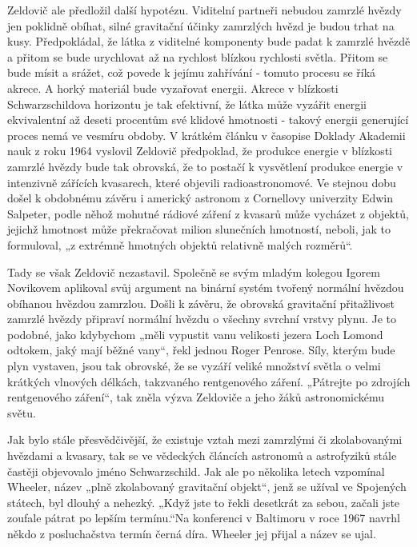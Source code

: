   Zeldovič ale předložil další hypotézu. Viditelní partneři nebudou zamrzlé hvězdy jen poklidně
  obíhat, silné gravitační účinky zamrzlých hvězd je budou trhat na kusy. Předpokládal, že látka z
  viditelné komponenty bude padat k zamrzlé hvězdě a přitom se bude urychlovat až na rychlost
  blízkou rychlosti světla. Přitom se bude mísit a srážet, což povede k jejímu zahřívání - tomuto
  procesu se říká akrece. A horký materiál bude vyzařovat energii. Akrece v blízkosti
  Schwarzschildova horizontu je tak efektivní, že látka může vyzářit energii ekvivalentní až deseti
  procentům své klidové hmotnosti - takový energii generující proces nemá ve vesmíru obdoby. V
  krátkém článku v časopise Doklady Akademii nauk z roku 1964 vyslovil Zeldovič předpoklad, že
  produkce energie v blízkosti zamrzlé hvězdy bude tak obrovská, že to postačí k vysvětlení produkce
  energie v intenzivně zářících kvasarech, které objevili radioastronomové. Ve stejnou dobu došel k
  obdobnému závěru i americký astronom z Cornellovy univerzity Edwin Salpeter, podle něhož mohutné
  rádiové záření z kvasarů může vycházet z objektů, jejichž hmotnost může překračovat milion
  slunečních hmotností, neboli, jak to formuloval, „z extrémně hmotných objektů relativně malých
  rozměrů“. 

  Tady se však Zeldovič nezastavil. Společně se svým mladým kolegou Igorem Novikovem aplikoval svůj
  argument na binární systém tvořený normální hvězdou obíhanou hvězdou zamrzlou. Došli k závěru, že
  obrovská gravitační přitažlivost zamrzlé hvězdy připraví normální hvězdu o všechny svrchní vrstvy
  plynu. Je to podobné, jako kdybychom „měli vypustit vanu velikosti jezera Loch Lomond odtokem,
  jaký mají běžné vany“, řekl jednou Roger Penrose. Síly, kterým bude plyn vystaven, jsou tak
  obrovské, že se vyzáří veliké množství světla o velmi krátkých vlnových délkách, takzvaného
  rentgenového záření. „Pátrejte po zdrojích rentgenového záření“, tak zněla výzva Zeldoviče a jeho
  žáků astronomickému světu. 

  Jak bylo stále přesvědčivější, že existuje vztah mezi zamrzlými či zkolabovanými hvězdami a
  kvasary, tak se ve vědeckých článcích astronomů a astrofyziků stále častěji objevovalo jméno
  Schwarzschild. Jak ale po několika letech vzpomínal Wheeler, název „plně zkolabovaný gravitační
  objekt“, jenž se užíval ve Spojených státech, byl dlouhý a nehezký. „Když jste to řekli desetkrát
  za sebou, začali jste zoufale pátrat po lepším termínu.“Na konferenci v Baltimoru v roce 1967
  navrhl někdo z posluchačstva termín černá díra. Wheeler jej přijal a název se ujal. 

